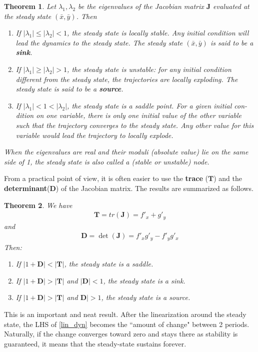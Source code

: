 \documentclass[11pt,a4paper]{book}
\newtheorem{theorem}{Theorem}[section]
\theoremstyle{definition}\newtheorem{definition}{Definition}
\theoremstyle{definition}\newtheorem{fact}{Fact}
\theoremstyle{definition}\newtheorem{remark}{Remark}
\theoremstyle{definition}\newtheorem{ex}{Ex.}
\theoremstyle{definition}\newtheorem{project}{Project}
\theoremstyle{definition}\newtheorem{problem}{Problem}
\theoremstyle{definition}\newtheorem{example}{Example}
\newenvironment{ftheorem}
{\begin{mdframed}\begin{theorem}}
		{\end{theorem}\end{mdframed}}
\numberwithin{theorem}{section}
\numberwithin{corollary}{chapter}
\numberwithin{assumption}{chapter}
\numberwithin{definition}{chapter}
\numberwithin{prop}{chapter}
\numberwithin{notation}{chapter}
\numberwithin{problem}{chapter}
\numberwithin{example}{chapter}
\numberwithin{fact}{chapter}
\numberwithin{ex}{chapter}
\def\D{\mathbf D}
\def\J{\mathbf J}
\def\T{\mathbf T}
\begin{document}
	\begin{ftheorem}
		Let $\lambda_1, \lambda_2$ be the eigenvalues of the Jacobian matrix $\J$ evaluated at the steady state $(\bar{x}, \bar{y})$. Then
		\begin{enumerate}
			\item If $|\lambda_1| \leq |\lambda_2| < 1$, the steady state is locally stable. Any initial condition will lead the dynamics to the steady state. The steady state $(\bar{x}, \bar{y})$ is said to be a \textbf{sink}.
			\item If $|\lambda_1| \geq |\lambda_2| > 1$, the steady state is unstable: for any initial condition different from the steady state, the trajectories are locally exploding. The steady state is said to be a \textbf{source}.
			\item If $|\lambda_1| < 1 < |\lambda_2| $, the steady state is a saddle point. For a given initial con- dition on one variable, there is only one initial value of the other variable such that the trajectory converges to the steady state. Any other value for this variable would lead the trajectory to locally explode.
		\end{enumerate}
		When the eigenvalues are real and their moduli (absolute value) lie on the same side of 1, the steady state is also called a (stable or unstable) \textit{node}.
	\end{ftheorem}
	
	From a practical point of view, it is often easier to use the \textbf{trace} ($\T$) and the \textbf{determinant}($\D$) of the Jacobian matrix. The results are summarized as follows.
	\begin{ftheorem}
		We have
		\begin{align*}
			\T = tr(\J) = f'_x + g'_y 
		\end{align*}
		and
		\begin{align*}
			  \D  = \det(\J)  =  f'_x g'_y - f'_y g'_x 
		\end{align*}
		Then:
		\begin{enumerate}
			\item If $| 1 + \D | < |\T|$, the steady state is a saddle. 
			\item If $|1+\D| > |\T|$ and $|\D| < 1$, the steady state is a sink.
			\item If $|1+\D| > |\T|$ and $\D| > 1$, the steady state is a source.
		\end{enumerate}
	\end{ftheorem} 
	
	This is an important and neat result. After the linearization around the steady state, the LHS of \eqref{lin_dyn} becomes the ``amount of change" between 2 periods. Naturally, if the change converges toward zero and stays there as stability is guaranteed, it means that the steady-state sustains forever.
	
\end{document}
